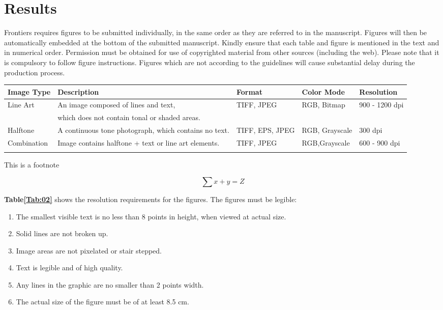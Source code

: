 \documentclass{frontiersMED} %
\begin{document}



\section{Results}

Frontiers requires figures to be submitted individually, in the same order as they are referred to in the manuscript. Figures will then be automatically embedded at the bottom of the submitted manuscript. Kindly ensure that each table and figure is mentioned in the text and in numerical order. Permission must be obtained for use of copyrighted material from other sources (including the web). Please note that it is compulsory to follow figure instructions. Figures which are not according to the guidelines will cause substantial delay during the production process.

\begin{table}[!t]
{\begin{tabular}{lllll}\toprule
Image Type & Description & Format & Color Mode & Resolution\\\midrule
Line Art & An image composed of lines and text,  & TIFF, JPEG & RGB, Bitmap & 900 - 1200 dpi\\
           & which does not contain tonal or shaded areas.& & &\\
           Halftone & A continuous tone photograph, which contains no text. & TIFF, EPS, JPEG & RGB, Grayscale & 300 dpi\\
Combination & Image contains halftone + text or line art elements. & TIFF, JPEG & RGB,Grayscale & 600 - 900 dpi\\\botrule
\end{tabular}}{This is a footnote}
\end{table}

\begin{equation}
\sum x+ y =Z\label{eq:01}
\end{equation}

\textbf{Table\ref{Tab:02}} shows the resolution requirements for the figures. The figures must be legible:
\begin{enumerate}
\item The smallest visible text is no less than 8 points in height, when viewed at actual size.
\item Solid lines are not broken up.
\item Image areas are not pixelated or stair stepped.
\item Text is legible and of high quality.
\item Any lines in the graphic are no smaller than 2 points width.
\item The actual size of the figure must be of at least 8.5 cm.
\end{enumerate}
\end{document}
